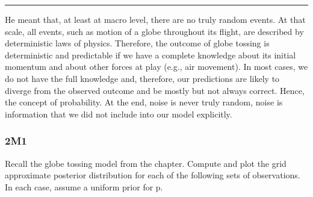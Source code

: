 \documentclass[
]{book}
\begin{document}
\begin{center}\rule{0.5\linewidth}{0.5pt}\end{center}

He meant that, at least at macro level, there are no truly random events. At that scale, all events, such as motion of a globe throughout its flight, are described by deterministic laws of physics. Therefore, the outcome of globe tossing is deterministic and predictable if we have a complete knowledge about its initial momentum and about other forces at play (e.g., air movement). In most cases, we do not have the full knowledge and, therefore, our predictions are likely to diverge from the observed outcome and be mostly but not always correct. Hence, the concept of probability. At the end, noise is never truly random, noise is information that we did not include into our model explicitly.

\hypertarget{m1}{%
\subsubsection*{2M1}\label{m1}}

Recall the globe tossing model from the chapter. Compute and plot the grid approximate posterior distribution for each of the following sets of observations. In each case, assume a uniform prior for p.
\end{document}
